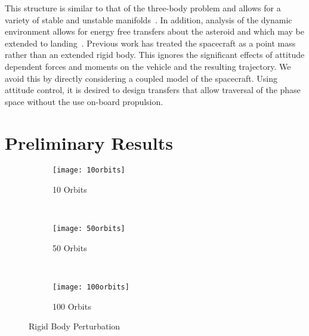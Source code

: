 \documentclass[11pt]{article} %
\begin{document}
This structure is similar to that of the three-body problem and allows for a variety of stable and unstable manifolds~\cite{hu2002}.
In addition, analysis of the dynamic environment allows for energy free transfers about the asteroid and which may be extended to landing~\cite{herrera2014}.
Previous work has treated the spacecraft as a point mass rather than an extended rigid body.
This ignores the significant effects of attitude dependent forces and moments on the vehicle and the resulting trajectory. 
We avoid this by directly considering a coupled model of the spacecraft.
Using attitude control, it is desired to design transfers that allow traversal of the phase space without the use on-board propulsion.

%
%

\section{Preliminary Results}
\begin{figure}
	\centering 
	\begin{subfigure}[htbp]{0.3\textwidth} 
		\texttt{[image: 10orbits]} 
		\caption{\num{10} Orbits} \label{fig:10orbits} 
	\end{subfigure}~ %
	\begin{subfigure}[htbp]{0.3\textwidth} 
		\texttt{[image: 50orbits]} 
		\caption{\num{50} Orbits} \label{fig:50orbits} 
	\end{subfigure} ~ %
	\begin{subfigure}[htbp]{0.3\textwidth} 
		\texttt{[image: 100orbits]} 
		\caption{\num{100} Orbits} \label{fig:100orbits} 
	\end{subfigure} 
	\caption{Rigid Body Perturbation}
	\label{fig:orbits} 
\end{figure}
\end{document}

